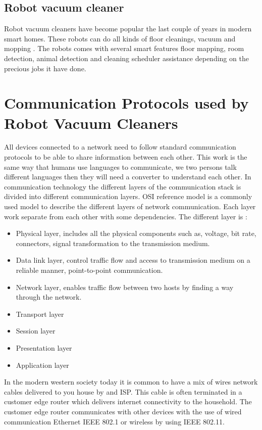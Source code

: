 \subsection{Robot vacuum cleaner}
Robot vacuum cleaners have become popular the last couple of years in modern smart homes. These robots can do all kinds of floor cleanings, vacuum and mopping \cite{roborock}. The robots comes with several smart features floor mapping, room detection, animal detection and cleaning scheduler assistance depending on the precious jobs it have done. 

\section{Communication Protocols used by Robot Vacuum Cleaners}

All devices connected to a network need to follow standard communication protocols to be able to share information between each other. This work is the same way that humans use languages to communicate, we two persons talk different languages then they will need a converter to understand each other. In communication technology the different layers of the communication stack is divided into different communication layers. OSI reference model \cite{osimodel} is a commonly used model to describe the different layers of network communication. Each layer work separate from each other with some dependencies. The different layer is \cite{osimodel}: 
\begin{itemize}
    \item Physical layer, includes all the physical components such as, voltage, bit rate, connectors, signal transformation to the transmission medium. 
    \item Data link layer, control traffic flow and access to transmission medium on a reliable manner, point-to-point communication. 
    \item Network layer, enables traffic flow between two hosts by finding a way through the network. 
    \item Transport layer 
    \item Session layer 
    \item Presentation layer 
    \item Application layer
\end{itemize}
In the modern western society today it is common to have a mix of wires network cables delivered to you house by and ISP. This cable is often terminated in a customer edge router which delivers internet connectivity to the household. The customer edge router communicates with other devices with the use of wired communication Ethernet IEEE 802.1 or wireless by using IEEE 802.11. 

